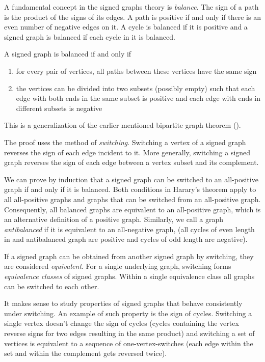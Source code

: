 A fundamental concept in the signed graphs theory is \textit{balance}. The sign of a path is the product of the signs of its edges. A path is positive if and only if there is an even number of negative edges on it. A cycle is balanced if it is positive and a signed graph is balanced if each cycle in it is balanced\cite{harary}.

\begin{theorem}[Harary]\label{th:harary}
    A signed graph is balanced if and only if
    \begin{enumerate}
        \item for every pair of vertices, all paths between these vertices have the same sign
        \item the vertices can be divided into two subsets (possibly empty) such that each edge with both ends in the same subset is positive and each edge with ends in different subsets is negative
    \end{enumerate}

    This is a generalization of the earlier mentioned bipartite graph theorem ().
\end{theorem}

The proof uses the method of \textit{switching}. Switching a vertex of a signed graph reverses the sign of each edge incident to it. More generally, switching a signed graph reverses the sign of each edge between a vertex subset and its complement.

We can prove by induction that a signed graph can be switched to an all-positive graph if and only if it is balanced. Both conditions in Harary's theorem apply to all all-positive graphs and graphs that can be switched from an all-positive graph. Consequently, all balanced graphs are equivalent to an all-positive graph, which is an alternative definition of a positive graph. Similarly, we call a graph \textit{antibalanced} if it is equivalent to an all-negative graph, (all cycles of even length in and antibalanced graph are positive and cycles of odd length are negative).

\begin{definition}
    If a signed graph can be obtained from another signed graph by switching, they are considered \textit{equivalent}. For a single underlying graph, switching forms \textit{equivalence classes} of signed graphs. Within a single equivalence class all graphs can be switched to each other.
\end{definition}

It makes sense to study properties of signed graphs that behave consistently under switching. An example of such property is the sign of cycles. Switching a single vertex doesn't change the sign of cycles (cycles containing the vertex reverse signs for two edges resulting in the same product) and switching a set of vertices is equivalent to a sequence of one-vertex-switches (each edge within the set and within the complement gets reversed twice).

